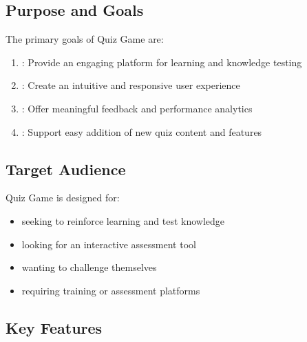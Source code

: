 \documentclass[letterpaper,10pt,english]{sphinxmanual}
\begin{document}
\subsection{Purpose and Goals}
\label{\detokenize{introduction:purpose-and-goals}}
\sphinxAtStartPar
The primary goals of Quiz Game are:
\begin{enumerate}
%
\item {} 
\sphinxAtStartPar
{}: Provide an engaging platform for learning and knowledge testing

\item {} 
\sphinxAtStartPar
{}: Create an intuitive and responsive user experience

\item {} 
\sphinxAtStartPar
{}: Offer meaningful feedback and performance analytics

\item {} 
\sphinxAtStartPar
{}: Support easy addition of new quiz content and features

\end{enumerate}


\subsection{Target Audience}
\label{\detokenize{introduction:target-audience}}
\sphinxAtStartPar
Quiz Game is designed for:
\begin{itemize}
\item {} 
\sphinxAtStartPar
{} seeking to reinforce learning and test knowledge

\item {} 
\sphinxAtStartPar
{} looking for an interactive assessment tool

\item {} 
\sphinxAtStartPar
{} wanting to challenge themselves

\item {} 
\sphinxAtStartPar
{} requiring training or assessment platforms

\end{itemize}


\subsection{Key Features}
\label{\detokenize{introduction:key-features}}
\end{document}
